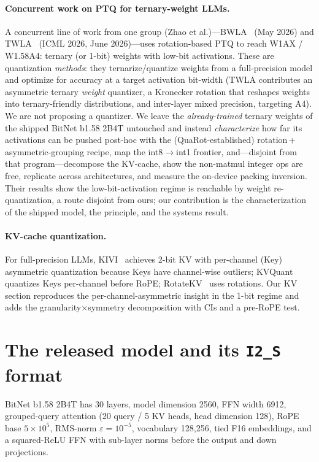 \documentclass[11pt]{article}
\begin{document}
\paragraph{Concurrent work on PTQ for ternary-weight LLMs.} A concurrent line of work
from one group (Zhao et al.)---BWLA~\cite{wang2026bwla} (May 2026) and
TWLA~\cite{li2026twla} (ICML 2026, June 2026)---uses rotation-based PTQ to reach
W1AX / W1.58A4: ternary (or 1-bit) weights with low-bit activations. These are
quantization \emph{methods}: they ternarize/quantize weights from a full-precision
model and optimize for accuracy at a target activation bit-width (TWLA contributes an
asymmetric ternary \emph{weight} quantizer, a Kronecker rotation that reshapes weights
into ternary-friendly distributions, and inter-layer mixed precision, targeting A4).
We are not proposing a quantizer. We leave the \emph{already-trained} ternary weights
of the shipped BitNet b1.58 2B4T untouched and instead \emph{characterize} how far its
activations can be pushed post-hoc with the (QuaRot-established)
rotation\,+\,asymmetric-grouping recipe, map the int8$\to$int1 frontier,
and---disjoint from that program---decompose the KV-cache, show the non-matmul integer
ops are free, replicate across architectures, and measure the on-device packing
inversion. Their results show the low-bit-activation regime is reachable by weight
re-quantization, a route disjoint from ours; our contribution is the characterization
of the shipped model, the principle, and the systems result.

\paragraph{KV-cache quantization.} For full-precision LLMs,
KIVI~\cite{liu2024kivi} achieves 2-bit KV with per-channel (Key) asymmetric
quantization because Keys have channel-wise outliers; KVQuant~\cite{hooper2024kvquant}
quantizes Keys per-channel before RoPE; RotateKV~\cite{su2025rotatekv} uses
rotations. Our KV section reproduces the per-channel-asymmetric insight in the
1-bit regime and adds the granularity$\times$symmetry decomposition with CIs and a
pre-RoPE test.

\section{The released model and its \texttt{I2\_S} format}
\label{sec:i2s}
BitNet b1.58 2B4T has 30 layers, model dimension 2560, FFN width 6912, grouped-query
attention (20 query / 5 KV heads, head dimension 128), RoPE base $5\times10^5$,
RMS-norm $\varepsilon=10^{-5}$, vocabulary 128{,}256, tied F16 embeddings, and a
squared-ReLU FFN with sub-layer norms before the output and down projections.
\end{document}
